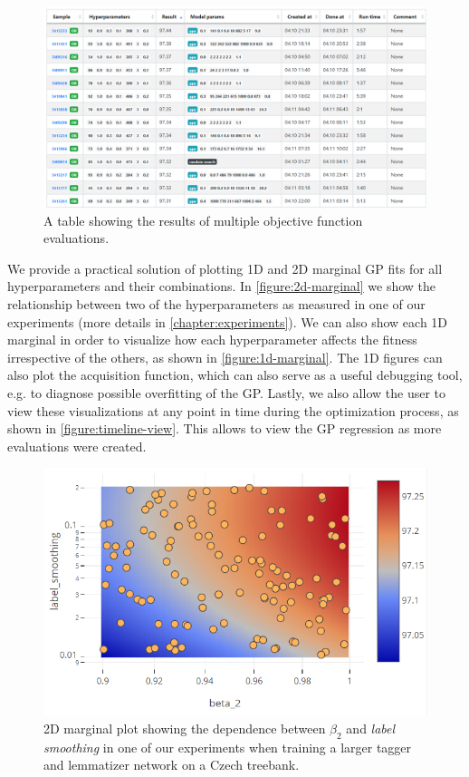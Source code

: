 \begin{figure}
	\begin{center}
		\includegraphics[width=1.0\textwidth]{images/sample-table.png}
		\caption{A table showing the results of multiple objective function evaluations.}
	\end{center}
\end{figure}
\label{figure:sample-table}

We provide a practical solution of plotting 1D and 2D marginal GP fits for all hyperparameters and their combinations. In \autoref{figure:2d-marginal} we show the relationship between two of the hyperparameters as measured in one of our experiments (more details in \autoref{chapter:experiments}). We can also show each 1D marginal in order to visualize how each hyperparameter affects the fitness irrespective of the others, as shown in \autoref{figure:1d-marginal}. The 1D figures can also plot the acquisition function, which can also serve as a useful debugging tool, e.g. to diagnose possible overfitting of the GP. Lastly, we also allow the user to view these visualizations at any point in time during the optimization process, as shown in \autoref{figure:timeline-view}. This allows to view the GP regression as more evaluations were created.

\begin{figure}
	\begin{center}
		\includegraphics[width=1.0\textwidth]{images/2d-marginal.png}
		\caption{2D marginal plot showing the dependence between $\beta_2$ and \emph{label smoothing} in one of our experiments when training a larger tagger and lemmatizer network on a Czech treebank.}
	\end{center}
\end{figure}
\label{figure:2d-marginal}

